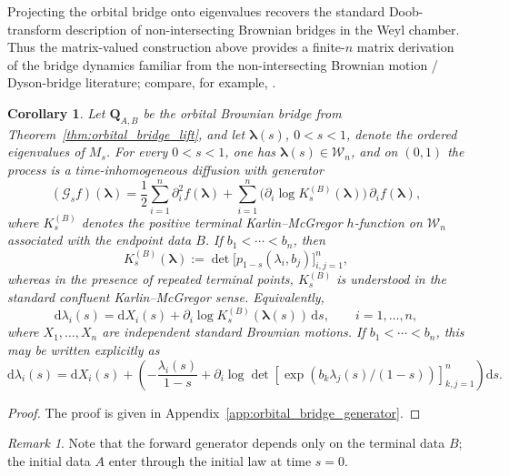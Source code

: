 \documentclass[11pt,a4paper]{article}
\newtheorem{corollary}[theorem]{Corollary}
\theoremstyle{definition}\newtheorem{definition}[theorem]{Definition}
\theoremstyle{remark}\newtheorem{remark}[theorem]{Remark}
\numberwithin{equation}{section}
\newcommand{\dd}{\mathrm{d}}
\begin{document}
Projecting the orbital bridge onto eigenvalues recovers the standard
Doob-transform description of non-intersecting Brownian bridges in the Weyl
chamber. Thus the matrix-valued construction above provides a finite-$n$ matrix
derivation of the bridge dynamics familiar from the non-intersecting Brownian
motion / Dyson-bridge literature; compare, for example,
\cite{Dyson1962,KatoriTanemura2003,GrelaMajumdarSchehr2021}.

\begin{corollary}
\label{cor:orbital_bridge_eigenvalue_dynamics}
Let $\mathbf Q_{A,B}$ be the orbital Brownian bridge from
Theorem~\ref{thm:orbital_bridge_lift}, and let
$\bm\lambda(s)$, $0<s<1$, denote the ordered eigenvalues of $M_s$.
For every $0<s<1$, one has $\bm\lambda(s)\in\mathcal W_n$, and on $(0,1)$ the
process is a time-inhomogeneous diffusion with generator
\begin{equation}
\label{eq:generator_Doob_K_main}
(\mathcal G_s f)(\bm\lambda)
=
\frac12\sum_{i=1}^n \partial_i^2 f(\bm\lambda)
+
\sum_{i=1}^n
\bigl(\partial_i \log K_s^{(B)}(\bm\lambda)\bigr)\,\partial_i f(\bm\lambda),
\end{equation}
where $K_s^{(B)}$ denotes the positive terminal Karlin--McGregor $h$-function
on $\mathcal W_n$ associated with the endpoint data $B$.  If $b_1<\cdots<b_n$, then
\begin{equation}
\label{eq:K_s_terminal_main}
K_s^{(B)}(\bm\lambda)
:=
\det\!\bigl[p_{1-s}(\lambda_i,b_j)\bigr]_{i,j=1}^n,
\end{equation}
whereas in the presence of repeated terminal points, $K_s^{(B)}$ is understood
in the standard confluent Karlin--McGregor sense. Equivalently,
\begin{equation}
\dd \lambda_i(s)
=
\dd X_i(s)
+
\partial_i\log K_s^{(B)}(\bm\lambda(s))\,\dd s,
\qquad i=1,\dots,n,
\end{equation}
where $X_1,\dots,X_n$ are independent standard Brownian motions.
If $b_1<\cdots<b_n$, this may be written explicitly as
\begin{equation}
\dd \lambda_i(s)
=
\dd X_i(s)
+
\left(
-\frac{\lambda_i(s)}{1-s}
+
\partial_i\log\det[\exp(b_k\lambda_j(s)/(1-s))]_{k,j=1}^n
\right)\dd s.
\end{equation}
\end{corollary}
\begin{proof}
    The proof is given in Appendix~\ref{app:orbital_bridge_generator}.
\end{proof}
\begin{remark}
   Note that the forward generator depends only on the terminal data $B$; the
initial data $A$ enter through the initial law at time $s=0$.  
\end{remark} 
\end{document}
